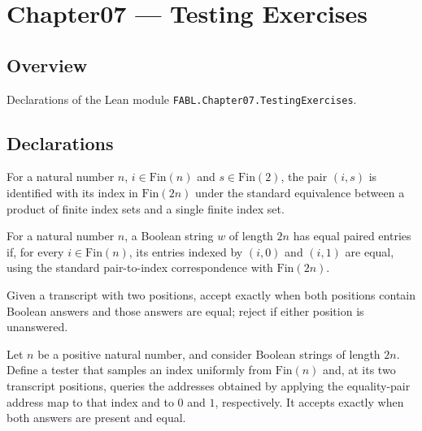\chapter{Chapter07 — Testing Exercises}
\section{Overview}

Declarations of the Lean module \texttt{FABL.Chapter07.TestingExercises}.

\section{Declarations}

\begin{definition}
\label{FABL.equalityPairIndex}
\leanok
For a natural number $n$, $i\in\mathrm{Fin}(n)$ and $s\in\mathrm{Fin}(2)$, the pair $(i,s)$ is
identified with its index in $\mathrm{Fin}(2n)$ under the standard equivalence between a
product of finite index sets and a single finite index set.
\end{definition}

\begin{definition}
\label{FABL.IsEqualPairString}
\leanok
{}
For a natural number $n$, a Boolean string $w$ of length $2n$ has equal paired entries if, for every $i\in\mathrm{Fin}(n)$, its entries indexed by $(i,0)$ and $(i,1)$ are equal, using the standard
pair-to-index correspondence with $\mathrm{Fin}(2n)$.
\end{definition}

\begin{definition}
\label{FABL.equalityPairTranscriptAccept}
\leanok
Given a transcript with two positions, accept exactly when both positions contain
Boolean answers and those answers are equal; reject if either position is unanswered.
\end{definition}

\begin{definition}
\label{FABL.equalityPairStringTester}
\leanok
{}
Let $n$ be a positive natural number, and consider Boolean strings of length $2n$.
Define a tester that samples an index uniformly from $\mathrm{Fin}(n)$ and, at its two transcript
positions, queries the addresses obtained by applying the equality-pair address map to
that index and to $0$ and $1$, respectively. It accepts exactly when both answers are
present and equal.
\end{definition}

